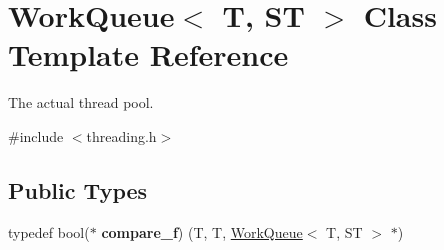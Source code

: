 \hypertarget{class_work_queue}{}\section{Work\+Queue$<$ T, ST $>$ Class Template Reference}
\label{class_work_queue}


The actual thread pool.  




{\ttfamily \#include $<$threading.\+h$>$}

\subsection*{Public Types}
\begin{DoxyCompactItemize}
\item 
typedef bool($\ast$ {\bfseries compare\+\_\+f}) (T, T, \hyperlink{class_work_queue}{Work\+Queue}$<$ T, ST $>$ $\ast$)\hypertarget{class_work_queue_af440662e6d5957850d9192f4dfd87e4c}{}\label{class_work_queue_af440662e6d5957850d9192f4dfd87e4c}

\end{DoxyCompactItemize}
